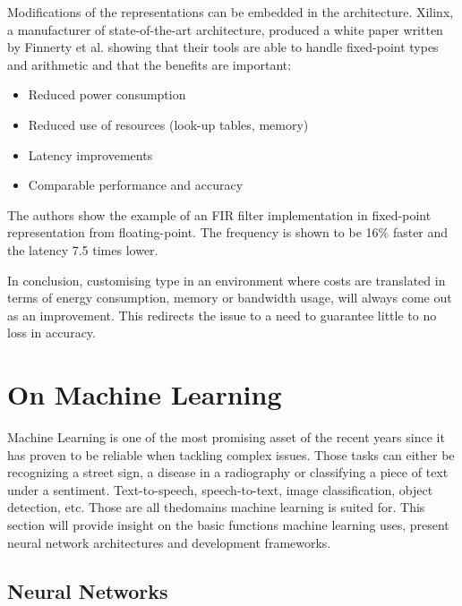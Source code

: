 Modifications of the representations can be embedded in the architecture. Xilinx, a manufacturer of state-of-the-art architecture, produced a white paper written by Finnerty et al. \cite{Xilinx2017} showing that their tools are able to handle fixed-point types and arithmetic and that the benefits are important:
\begin{itemize}
  \item Reduced power consumption
  \item Reduced use of resources (look-up tables, memory)
  \item Latency improvements
  \item Comparable performance and accuracy
\end{itemize}
The authors show the example of an FIR filter implementation in fixed-point representation from floating-point. The frequency is shown to be 16\% faster and the latency 7.5 times lower.

In conclusion, customising type in an environment where costs are translated in terms of energy consumption, memory or bandwidth usage, will always come out as an improvement. This redirects the issue to a need to guarantee little to no loss in accuracy.


\section{On Machine Learning}

Machine Learning is one of the most promising asset of the recent years since it has proven to be reliable when tackling complex issues. Those tasks can either be recognizing a street sign, a disease in a radiography or classifying a piece of text under a sentiment. Text-to-speech, speech-to-text, image classification, object detection, etc. Those are all thedomains machine learning is suited for. This section will provide insight on the basic functions machine learning uses, present neural network architectures and development frameworks.


\subsection{Neural Networks}

